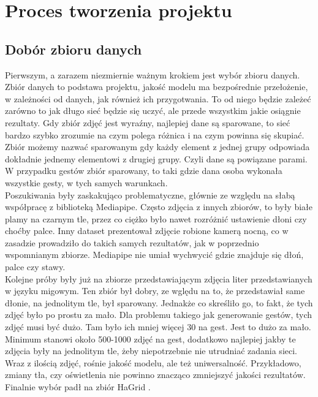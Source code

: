 \documentclass[12pt]{article}
\begin{document}
\begin{sloppypar}
\section{Proces tworzenia projektu} \label{proces}
{
  \subsection{Dobór zbioru danych} \label{dataset}
  {
    Pierwszym, a zarazem niezmiernie ważnym krokiem jest wybór zbioru danych. 
    Zbiór danych to podstawa projektu, jakość modelu ma bezpośrednie przełożenie, w zależności od danych, jak również ich przygotwania. 
    To od niego będzie zależeć zarówno to jak długo sieć będzie się uczyć, ale przede wszystkim jakie osiągnie rezultaty. 
    Gdy zbiór zdjęć jest wyraźny, najlepiej dane są sparowane, to sieć bardzo szybko zrozumie na czym polega różnica i na czym powinna się skupiać.
    Zbiór możemy nazwać sparowanym gdy każdy element z jednej grupy odpowiada dokładnie jednemy elementowi z drugiej grupy. 
    Czyli dane są powiązane parami. W przypadku gestów zbiór sparowany, to taki gdzie dana osoba wykonała wszystkie gesty, w tych samych warunkach. \\
    Poszukiwania były zaskakująco problematyczne, głównie ze względu na słabą współpracę z biblioteką Mediapipe. 
    Często zdjęcia z innych zbiorów, to były białe plamy na czarnym tle, przez co ciężko było nawet rozróżnić ustawienie dłoni czy choćby palce.
    Inny dataset prezentował zdjęcie robione kamerą nocną, co w zasadzie prowadziło do takich samych rezultatów, jak w poprzednio wspomnianym zbiorze.
    Mediapipe nie umiał wychwycić gdzie znajduje się dłoń, palce czy stawy. \\
    Kolejne próby były już na zbiorze przedstawiającym zdjęcia liter przedstawianych w języku migowym. 
    Ten zbiór był dobry, ze wględu na to, że przedstawiał same dłonie, na jednolitym tle, był sparowany. 
    Jednakże co skreśliło go, to fakt, że tych zdjęć było po prostu za mało. 
    Dla problemu takiego jak generowanie gestów, tych zdjęć musi być dużo. Tam było ich mniej więcej 30 na gest. 
    Jest to dużo za mało. Minimum stanowi około 500-1000 zdjęć na gest, dodatkowo najlepiej jakby te zdjęcia były na jednolitym tle, żeby niepotrzebnie nie utrudniać zadania sieci. 
    Wraz z ilością zdjęć, rośnie jakość modelu, ale też uniwersalność. Przykładowo, zmiany tła, czy oświetlenia nie powinno znacząco zmniejszyć jakości rezultatów. \\
    Finalnie wybór padł na zbiór HaGrid \cite{nuzhdin2024hagridv21mimagesstatic}.
}}
\end{sloppypar}
\end{document}
